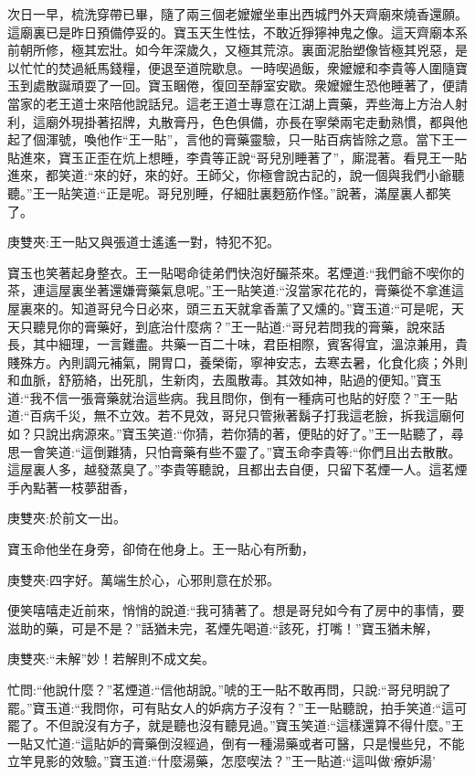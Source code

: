 \begin{parag}
    次日一早，梳洗穿帶已畢，隨了兩三個老嬤嬤坐車出西城門外天齊廟來燒香還願。這廟裏已是昨日預備停妥的。寶玉天生性怯，不敢近猙獰神鬼之像。這天齊廟本系前朝所修，極其宏壯。如今年深歲久，又極其荒涼。裏面泥胎塑像皆極其兇惡，是以忙忙的焚過紙馬錢糧，便退至道院歇息。一時喫過飯，衆嬤嬤和李貴等人圍隨寶玉到處散誕頑耍了一回。寶玉睏倦，復回至靜室安歇。衆嬤嬤生恐他睡著了，便請當家的老王道士來陪他說話兒。這老王道士專意在江湖上賣藥，弄些海上方治人射利，這廟外現掛著招牌，丸散膏丹，色色俱備，亦長在寧榮兩宅走動熟慣，都與他起了個渾號，喚他作“王一貼”，言他的膏藥靈驗，只一貼百病皆除之意。當下王一貼進來，寶玉正歪在炕上想睡，李貴等正說“哥兒別睡著了”，廝混著。看見王一貼進來，都笑道:“來的好，來的好。王師父，你極會說古記的，說一個與我們小爺聽聽。”王一貼笑道:“正是呢。哥兒別睡，仔細肚裏麪筋作怪。”說著，滿屋裏人都笑了。\begin{note}庚雙夾:王一貼又與張道士遙遙一對，特犯不犯。\end{note}寶玉也笑著起身整衣。王一貼喝命徒弟們快泡好釅茶來。茗煙道:“我們爺不喫你的茶，連這屋裏坐著還嫌膏藥氣息呢。”王一貼笑道:“沒當家花花的，膏藥從不拿進這屋裏來的。知道哥兒今日必來，頭三五天就拿香薰了又燻的。”寶玉道:“可是呢，天天只聽見你的膏藥好，到底治什麼病？”王一貼道:“哥兒若問我的膏藥，說來話長，其中細理，一言難盡。共藥一百二十味，君臣相際，賓客得宜，溫涼兼用，貴賤殊方。內則調元補氣，開胃口，養榮衛，寧神安志，去寒去暑，化食化痰；外則和血脈，舒筋絡，出死肌，生新肉，去風散毒。其效如神，貼過的便知。”寶玉道:“我不信一張膏藥就治這些病。我且問你，倒有一種病可也貼的好麼？”王一貼道:“百病千災，無不立效。若不見效，哥兒只管揪著鬍子打我這老臉，拆我這廟何如？只說出病源來。”寶玉笑道:“你猜，若你猜的著，便貼的好了。”王一貼聽了，尋思一會笑道:“這倒難猜，只怕膏藥有些不靈了。”寶玉命李貴等:“你們且出去散散。這屋裏人多，越發蒸臭了。”李貴等聽說，且都出去自便，只留下茗煙一人。這茗煙手內點著一枝夢甜香，\begin{note}庚雙夾:於前文一出。\end{note}寶玉命他坐在身旁，卻倚在他身上。王一貼心有所動，\begin{note}庚雙夾:四字好。萬端生於心，心邪則意在於邪。\end{note}便笑嘻嘻走近前來，悄悄的說道:“我可猜著了。想是哥兒如今有了房中的事情，要滋助的藥，可是不是？”話猶未完，茗煙先喝道:“該死，打嘴！”寶玉猶未解，\begin{note}庚雙夾:“未解”妙！若解則不成文矣。\end{note}忙問:“他說什麼？”茗煙道:“信他胡說。”唬的王一貼不敢再問，只說:“哥兒明說了罷。”寶玉道:“我問你，可有貼女人的妒病方子沒有？”王一貼聽說，拍手笑道:“這可罷了。不但說沒有方子，就是聽也沒有聽見過。”寶玉笑道:“這樣還算不得什麼。”王一貼又忙道:“這貼妒的膏藥倒沒經過，倒有一種湯藥或者可醫，只是慢些兒，不能立竿見影的效驗。”寶玉道:“什麼湯藥，怎麼喫法？”王一貼道:“這叫做‘療妒湯’
\end{parag}
